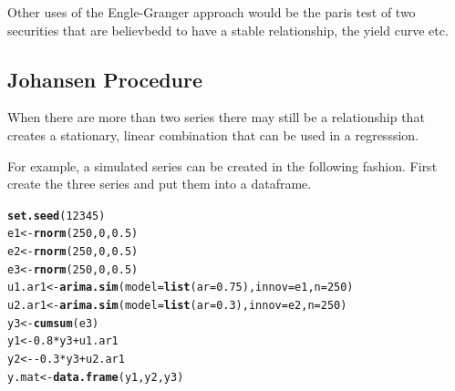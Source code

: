 \documentclass{article}\usepackage{graphicx, color}
\makeatletter
\newcommand{\hlfunctioncall}[1]{\textcolor[rgb]{0.501960784313725,0,0.329411764705882}{\textbf{#1}}}%
\newenvironment{kframe}{%
 \def\at@end@of@kframe{}%
 \ifinner\ifhmode%
  \def\at@end@of@kframe{\end{minipage}}%
  \begin{minipage}{\columnwidth}%
 \fi\fi%
 \def\FrameCommand##1{\hskip\@totalleftmargin \hskip-\fboxsep
 \colorbox{shadecolor}{##1}\hskip-\fboxsep
     \hskip-\linewidth \hskip-\@totalleftmargin \hskip\columnwidth}%
 \MakeFramed {\advance\hsize-\width
   \@totalleftmargin\z@ \linewidth\hsize
   \@setminipage}}%
 {\par\unskip\endMakeFramed%
 \at@end@of@kframe}
\newenvironment{knitrout}{}{} %
\makeatother
\begin{document}
Other uses of the Engle-Granger approach would be the paris test of two securities that are believbedd to have a stable relationship, the yield curve etc. 

\subsection{Johansen Procedure}
When there are more than two series there may still be a relationship that creates a stationary, linear combination that can be used in a regresssion.  

For example, a simulated series can be created in the following fashion. First create the three series and put them into a dataframe.  
\begin{knitrout}
\color{fgcolor}\begin{kframe}
\begin{alltt}
\hlfunctioncall{set.seed}(12345)
e1 <- \hlfunctioncall{rnorm}(250, 0, 0.5)
e2 <- \hlfunctioncall{rnorm}(250, 0, 0.5)
e3 <- \hlfunctioncall{rnorm}(250, 0, 0.5)
u1.ar1 <- \hlfunctioncall{arima.sim}(model = \hlfunctioncall{list}(ar = 0.75), innov = e1, n = 250)
u2.ar1 <- \hlfunctioncall{arima.sim}(model = \hlfunctioncall{list}(ar = 0.3), innov = e2, n = 250)
y3 <- \hlfunctioncall{cumsum}(e3)
y1 <- 0.8 * y3 + u1.ar1
y2 <- -0.3 * y3 + u2.ar1
y.mat <- \hlfunctioncall{data.frame}(y1, y2, y3)
\end{alltt}
\end{kframe}
\end{knitrout}
\end{document}

